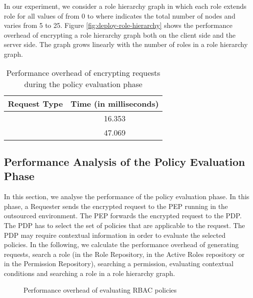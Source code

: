 \documentclass[final,5p,times,twocolumn]{elsarticle}
\begin{document}
In our experiment, we consider a role hierarchy graph in which each role  extends role  for all values of  from 0 to  where  indicates the total number of nodes and varies from 5 to 25. Figure \ref{fig:deploy-role-hierarchy} shows the performance overhead of encrypting a role hierarchy graph both on the client side and the server side. The graph grows linearly with the number of roles in a role hierarchy graph.

\begin{table}[htp]
\centering
\caption{Performance overhead of encrypting requests during the policy evaluation phase}
\label{tab:request}
{\small
\begin{tabular}{ |c|c| }
\hline
\textbf{Request Type} & \textbf{Time (in milliseconds)} \\ \hline
 & 16.353 \\ \hline
 & 47.069 \\ \hline
\end{tabular}
}
\end{table} 
\subsection{Performance Analysis of the Policy Evaluation Phase}
\label{sec:policy-evaluation}

In this section, we analyse the performance of the policy evaluation phase. In this phase, a Requester sends the encrypted request to the PEP running in the outsourced environment. The PEP forwards the encrypted request to the PDP. The PDP has to select the set of policies that are applicable to the request. The PDP may require contextual information in order to evaluate the selected policies. In the following, we calculate the performance overhead of generating requests, search a role (in the Role Repository, in the Active Roles repository or in the Permission Repository), searching a permission, evaluating contextual conditions and searching a role in a role hierarchy graph.

\begin{figure*}
\centering
{}
\caption{Performance overhead of evaluating RBAC policies}
\label{fig:policy-evaluation-rbac-policy}
\end{figure*}
\end{document}
